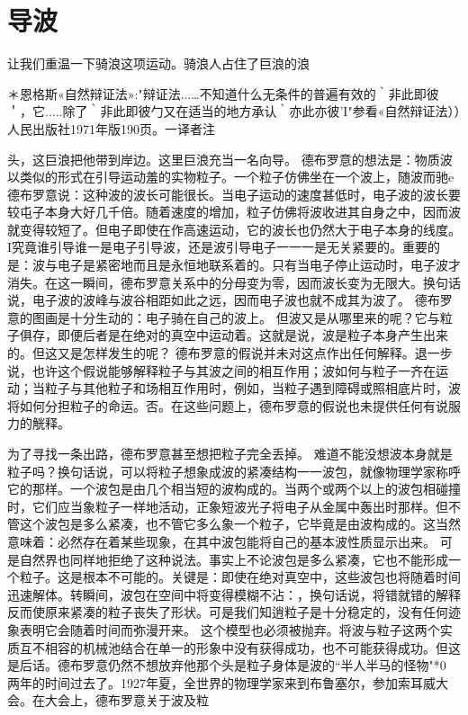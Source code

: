 \section{导波}

让我们重温一下骑浪这项运动。骑浪人占住了巨浪的浪

＊恩格斯«自然辩证法»:"辩证法...…不知道什么无条件的普遍有效的｀非此即彼＇，它.....除了｀非此即彼勹又在适当的地方承认｀亦此亦彼'I"参看«自然辩证法））人民出版社1971年版190页。一译者注


头，这巨浪把他带到岸边。这里巨浪充当一名向导。
德布罗意的想法是：物质波以类似的形式在引导运动羞的实物粒子。一个粒子仿佛坐在一个波上，随波而驰e
德布罗意说：这种波的波长可能很长。当电子运动的速度甚低时，电子波的波长要较屯子本身大好几千倍。随着速度的增加，粒子仿佛将波收进其自身之中，因而波就变得较短了。但电子即使在作高速运动，它的波长也仍然大于电子本身的线度。
I究竟谁引导谁一是电子引导波，还是波引导电子一一一是无关紧要的。重要的是：波与电子是紧密地而且是永恒地联系着的。只有当电子停止运动时，电子波才消失。在这一瞬间，德布罗意关系中的分母变为零，因而波长变为无限大。换句话说，电子波的波峰与波谷相距如此之远，因而电子波也就不成其为波了。
德布罗意的图画是十分生动的：电子骑在自己的波上。
但波又是从哪里来的呢？它与粒子俱存，即便后者是在绝对的真空中运动着。这就是说，波是粒子本身产生出来的。但这又是怎样发生的呢？
德布罗意的假说并未对这点作出任何解释。退一步说，也许这个假说能够解释粒子与其波之间的相互作用；波如何与粒子一齐在运动；当粒子与其他粒子和场相互作用时，例如，当粒子遇到障碍或照相底片时，波将如何分担粒子的命运。否。在这些问题上，德布罗意的假说也未提供任何有说服力的觥释。


为了寻找一条出路，德布罗意甚至想把粒子完全丢掉。
难道不能没想波本身就是粒子吗？换句话说，可以将粒子想象成波的紧凑结构一一波包，就像物理学家称呼它的那样。一个波包是由几个相当短的波构成的。当两个或两个以上的波包相碰撞时，它们应当象粒子一样地活动，正象短波光子将电子从金属中轰出时那样。但不管这个波包是多么紧凑，也不管它多么象一个粒子，它毕竟是由波构成的。这当然意味着：必然存在着某些现象，在其中波包能将自己的基本波性质显示出来。
可是自然界也同样地拒绝了这种说法。事实上不论波包是多么紧凑，它也不能形成一个粒子。这是根本不可能的。关键是：即使在绝对真空中，这些波包也将随着时间迅速解体。转瞬间，波包在空间中将变得模糊不沾：，换句话说，将错就错的解释反而使原来紧凑的粒子丧失了形状。可是我们知逍粒子是十分稳定的，没有任何迹象表明它会随着时间而弥漫开来。
这个模型也必须被抛弃。将波与粒子这两个实质互不相容的机械池结合在单一的形象中没有获得成功，也不可能获得成功。但这是后话。德布罗意仍然不想放弃他那个头是粒子身体是波的“半人半马的怪物"*0
两年的时间过去了。1927年夏，全世界的物理学家来到布鲁塞尔，参加索耳威大会。在大会上，德布罗意关于波及粒

